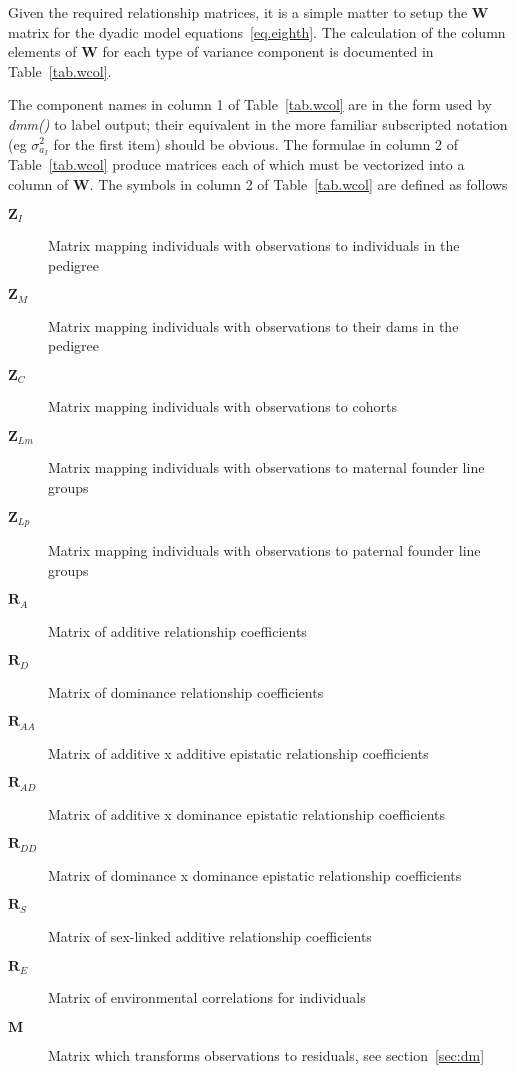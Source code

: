 \documentclass[titlepage]{article}  %
\begin{document}
Given the required relationship matrices, it is a simple matter to setup the ${\bm W}$ matrix for the dyadic model equations~\ref{eq.eighth}. The calculation of the column elements of ${\bm W}$ for each type of variance component is documented in Table~\ref{tab.wcol}.



The component names in column 1 of Table~\ref{tab.wcol} are in the form used by {\em dmm()} to label output; their equivalent in the more familiar subscripted notation (eg $\sigma^{2}_{a_{I}}$ for the first item) should be obvious.
The formulae in column 2 of Table~\ref{tab.wcol} produce matrices each of which must be vectorized into a column of ${\bm W}$.
The symbols in column 2 of Table~\ref{tab.wcol} are defined as follows

\begin{description}
\item [${\bm Z_{I}}$] Matrix mapping individuals with observations to individuals in the pedigree
\item [${\bm Z_{M}}$] Matrix mapping individuals with observations to their dams in  the pedigree
\item [${\bm Z_{C}}$] Matrix mapping individuals with observations to cohorts
\item [${\bm Z_{Lm}}$] Matrix mapping individuals with observations to maternal founder line groups
\item [${\bm Z_{Lp}}$] Matrix mapping individuals with observations to paternal founder line groups
\item[${\bm R_{A}}$] Matrix of additive relationship coefficients
\item[${\bm R_{D}}$] Matrix of dominance relationship coefficients
\item[${\bm R_{AA}}$] Matrix of additive x additive epistatic relationship coefficients
\item[${\bm R_{AD}}$] Matrix of additive x dominance epistatic relationship coefficients
\item[${\bm R_{DD}}$] Matrix of dominance x dominance epistatic relationship coefficients
\item[${\bm R_{S}}$] Matrix of sex-linked  additive relationship coefficients
\item[${\bm R_{E}}$] Matrix of environmental correlations for individuals
\item[${\bm M}$] Matrix which transforms observations to residuals, see section~\ref{sec:dm}
\end{description}
\end{document}
